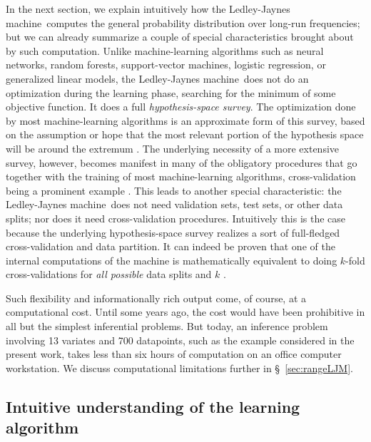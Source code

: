 \documentclass[utf8]{FrontiersinHarvard} %
\newcommand*{\sect}{\S}%
\newcommand*{\sects}{\S\S}%
\newcommand*{\chap}{ch.}%
\renewcommand*{\|}[1][]{\nonscript\:#1\vert\nonscript\:\mathopen{}}
\newcommand*{\ljm}{Ledley-Jaynes machine}
\begin{document}
In the next section, we explain intuitively how the \ljm\ computes the general probability distribution over long-run frequencies; but we can already summarize a couple of special characteristics brought about by such computation. Unlike machine-learning algorithms such as neural networks, random forests, support-vector machines, logistic regression, or generalized linear models, the \ljm\ does not do an optimization during the learning phase, searching for the minimum of some objective function. It does a full \emph{hypothesis-space survey}. %
The optimization done by most machine-learning algorithms is an approximate form of this survey, based on the assumption or hope that the most relevant portion of the hypothesis space will be around the extremum \citetext{\citealp[\chap~16]{mackay1992,murphy2012}; \citealp[see also][]{selfetal1987}}. The underlying necessity of a more extensive survey, however, becomes manifest in many of the obligatory procedures that go together with the training of most machine-learning algorithms, cross-validation being a prominent example \citep{mackay1992b}. This leads to another special characteristic: the \ljm\ does not need validation sets, test sets, or other data splits; nor does it need cross-validation procedures. Intuitively this is the case because the underlying hypothesis-space survey realizes a sort of full-fledged cross-validation and data partition. It can indeed be proven that one of the internal computations of the machine is mathematically equivalent to doing $k$-fold cross-validations for \emph{all possible} data splits and $k$ \citep{portamana2019b,fongetal2020}.

Such flexibility and informationally rich output come, of course, at a computational cost. Until some years ago, the cost would have been prohibitive in all but the simplest inferential problems. But today, an inference problem involving 13 variates and 700 datapoints, such as the example considered in the present work, takes less than six hours of computation on an office computer workstation. We discuss computational limitations further in \sect~\ref{sec:rangeLJM}.

\subsection{Intuitive understanding of the learning algorithm}
\label{sec:the_machine_learning}
\end{document}
